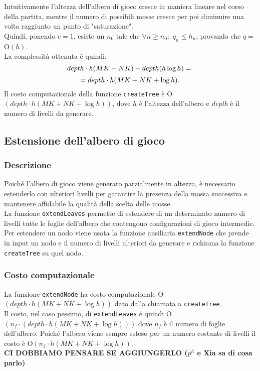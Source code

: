 \documentclass[11pt]{article}
\begin{document}
Intuitivamente l'altezza dell'albero di gioco cresce in maniera lineare nel corso della partita, mentre il numero di possibili mosse cresce per poi diminuire una volta raggiunto un punto di "saturazione".\\
Quindi, ponendo $c=1$, esiste un $n_0$ tale che $\forall n \geq n_0:$ $q_n \leq h_n$, provando che $q =$ O$(h)$.\\
La complessità ottenuta è quindi:
\begin{equation*}
depth \cdot h(MK+NK)+depth(h\log h)=\\
\end{equation*}
\begin{equation*}
=depth \cdot h(MK+NK+\log h).\\
\end{equation*}
Il costo computazionale della funzione \texttt{createTree} è O$(depth \cdot h(MK+NK+\log h))$, dove $h$ è l'altezza dell'albero e \textit{depth} è il numero di livelli da generare.

\subsection*{Estensione dell'albero di gioco}
\subsubsection*{Descrizione}
Poiché l'albero di gioco viene generato parzialmente in altezza, è necessario estenderlo con ulteriori livelli per garantire la presenza della mossa successiva e mantenere affidabile la qualità della scelta delle mosse.\\
La funzione \texttt{extendLeaves} permette di estendere di un determinato numero di livelli tutte le foglie dell'albero che contengono configurazioni di gioco intermedie.\\
Per estendere un nodo viene usata la funzione ausiliaria \texttt{extendNode} che prende in input un nodo e il numero di livelli ulteriori da generare e richiama la funzione \texttt{createTree} su quel nodo.
\subsubsection*{Costo computazionale}
La funzione \texttt{extendNode} ha costo computazionale O$(depth \cdot h(MK+NK+\log h))$ dato dalla chiamata a \texttt{createTree}.\\
Il costo, nel caso pessimo, di \texttt{extendLeaves} è quindi O$(n_f\cdot(depth \cdot h(MK+NK+\log h)))$ dove $n_f$ è il numero di foglie dell'albero. Poiché l'albero viene sempre esteso per un numero costante di livelli il costo è O$(n_f\cdot h(MK+NK+\log h))$.\\
\textbf{CI DOBBIAMO PENSARE SE AGGIUNGERLO ($p^h$ e Xia sa di cosa parlo)}
\end{document}

